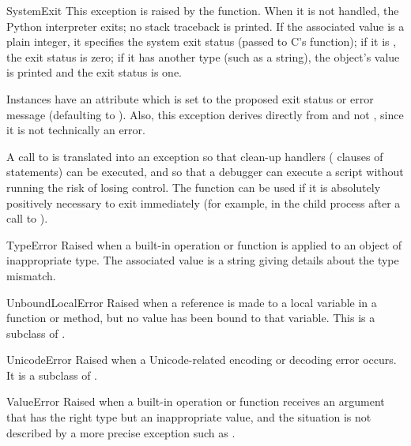 \begin{excdesc}{SystemExit}
  This exception is raised by the  function.  When it
  is not handled, the Python interpreter exits; no stack traceback is
  printed.  If the associated value is a plain integer, it specifies the
  system exit status (passed to C's  function); if it is
  , the exit status is zero; if it has another type (such as
  a string), the object's value is printed and the exit status is one.

  Instances have an attribute  which is set to the
  proposed exit status or error message (defaulting to ).
  Also, this exception derives directly from  and
  not , since it is not technically an error.

  A call to  is translated into an exception so that
  clean-up handlers ( clauses of  statements)
  can be executed, and so that a debugger can execute a script without
  running the risk of losing control.  The  function
  can be used if it is absolutely positively necessary to exit
  immediately (for example, in the child process after a call to
  ).
\end{excdesc}

\begin{excdesc}{TypeError}
  Raised when a built-in operation or function is applied to an object
  of inappropriate type.  The associated value is a string giving
  details about the type mismatch.
\end{excdesc}

\begin{excdesc}{UnboundLocalError}
  Raised when a reference is made to a local variable in a function or
  method, but no value has been bound to that variable.  This is a
  subclass of .
\end{excdesc}

\begin{excdesc}{UnicodeError}
  Raised when a Unicode-related encoding or decoding error occurs.  It
  is a subclass of .
\end{excdesc}

\begin{excdesc}{ValueError}
  Raised when a built-in operation or function receives an argument
  that has the right type but an inappropriate value, and the
  situation is not described by a more precise exception such as
  .
\end{excdesc}

